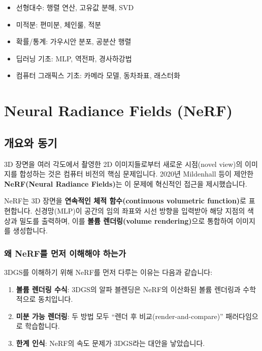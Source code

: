 \documentclass[11pt, a4paper]{report}
\begin{document}
\begin{importantnote}[title={이 교재를 읽기 위한 사전 지식}]
\begin{itemize}[leftmargin=*]
  \item 선형대수: 행렬 연산, 고유값 분해, SVD
  \item 미적분: 편미분, 체인룰, 적분
  \item 확률/통계: 가우시안 분포, 공분산 행렬
  \item 딥러닝 기초: MLP, 역전파, 경사하강법
  \item 컴퓨터 그래픽스 기초: 카메라 모델, 동차좌표, 래스터화
\end{itemize}
\end{importantnote}


\chapter{Neural Radiance Fields (NeRF)}
\label{ch:nerf}

\section{개요와 동기}

3D 장면을 여러 각도에서 촬영한 2D 이미지들로부터 새로운 시점(novel view)의 이미지를 합성하는 것은 컴퓨터 비전의 핵심 문제입니다. 2020년 Mildenhall 등이 제안한 \textbf{NeRF(Neural Radiance Fields)}는 이 문제에 혁신적인 접근을 제시했습니다.

\begin{keyidea}
NeRF는 3D 장면을 \textbf{연속적인 체적 함수(continuous volumetric function)}로 표현합니다. 신경망(MLP)이 공간의 임의 좌표와 시선 방향을 입력받아 해당 지점의 색상과 밀도를 출력하며, 이를 \textbf{볼륨 렌더링(volume rendering)}으로 통합하여 이미지를 생성합니다.
\end{keyidea}

\subsection{왜 NeRF를 먼저 이해해야 하는가}

3DGS를 이해하기 위해 NeRF를 먼저 다루는 이유는 다음과 같습니다:

\begin{enumerate}[leftmargin=*]
  \item \textbf{볼륨 렌더링 수식}: 3DGS의 알파 블렌딩은 NeRF의 이산화된 볼륨 렌더링과 수학적으로 동치입니다.
  \item \textbf{미분 가능 렌더링}: 두 방법 모두 ``렌더 후 비교(render-and-compare)'' 패러다임으로 학습합니다.
  \item \textbf{한계 인식}: NeRF의 속도 문제가 3DGS라는 대안을 낳았습니다.
\end{enumerate}
\end{document}
